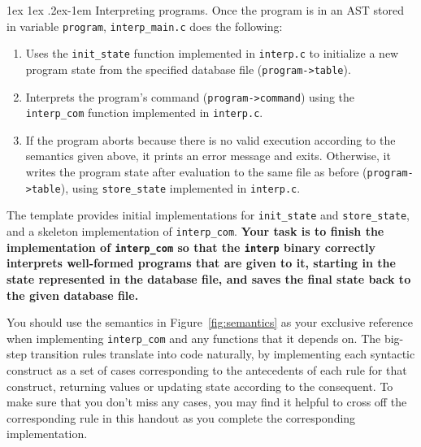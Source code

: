 \documentclass[11pt]{article}
\makeatletter
\renewcommand{\paragraph}{%
  \@startsection{paragraph}{4}%
  {\z@}{1ex \@plus 1ex \@minus .2ex}{-1em}%
  {\normalfont\normalsize\bfseries}
}
\makeatother
\begin{document}
\paragraph{Interpreting programs.} Once the program is in an AST stored in variable \verb'program', \verb'interp_main.c' does the following:
\begin{enumerate}
\item Uses the \verb'init_state' function implemented in \verb'interp.c' to initialize a new program state from the specified database file (\verb'program->table').
\item Interprets the program's command (\verb'program->command') using the \verb'interp_com' function implemented in \verb'interp.c'.
\item If the program aborts because there is no valid execution according to the semantics given above, it prints an error message and exits. Otherwise, it writes the program state after evaluation to the same file as before (\verb'program->table'), using \verb'store_state' implemented in \verb'interp.c'.
\end{enumerate}
The template provides initial implementations for \verb'init_state' and \verb'store_state', and a skeleton implementation of \verb'interp_com'. \textbf{Your task is to finish the implementation of \texttt{interp\_com} so that the \texttt{interp} binary correctly interprets well-formed programs that are given to it, starting in the state represented in the database file, and saves the final state back to the given database file.}

You should use the semantics in Figure~\ref{fig:semantics} as your exclusive reference when implementing \verb'interp_com' and any functions that it depends on. The big-step transition rules translate into code naturally, by implementing each syntactic construct as a set of cases corresponding to the antecedents of each rule for that construct, returning values or updating state according to the consequent. To make sure that you don't miss any cases, you may find it helpful to cross off the corresponding rule in this handout as you complete the corresponding implementation.
\end{document}
